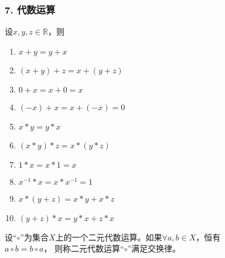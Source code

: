 \documentclass{beamer}
\begin{document}
\begin{CJK*}{UTF8}{gbsn}
\begin{frame}
  \frametitle{7. 代数运算}
  \begin{minipage}[t]{0.49\linewidth}
  \begin{block}{}
    设$x, y, z \in \mathbb{R}$，则
   \begin{enumerate}
   \item   $x + y = y + x$
   \item   $(x + y) + z = x + (y + z)$
   \item   $0 + x = x + 0 = x$
   \item   $(-x) + x = x + (-x) = 0$
   \item   $x * y = y * x$
   \item   $(x * y) * z = x * (y *z)$
   \item   $1 * x = x * 1 = x$
   \item   $x^{-1} * x = x * x^{-1} = 1$
   \item   $x* (y + z) = x * y + x * z$
   \item   $(y + z) * x = y * x + z * x$
    \end{enumerate}
  \end{block}\pause
\end{minipage}
\begin{minipage}[t]{0.49\linewidth}
  \begin{Def}
    设“$\circ$”为集合$X$上的一个二元代数运算。如果$\forall a, b \in X$，恒有\\$a \circ b = b \circ a$， 则称二元代数运算“$\circ$”满足\alert{交换律}。
  \end{Def}
\end{minipage}
\end{frame}


\end{CJK*}
\end{document}
